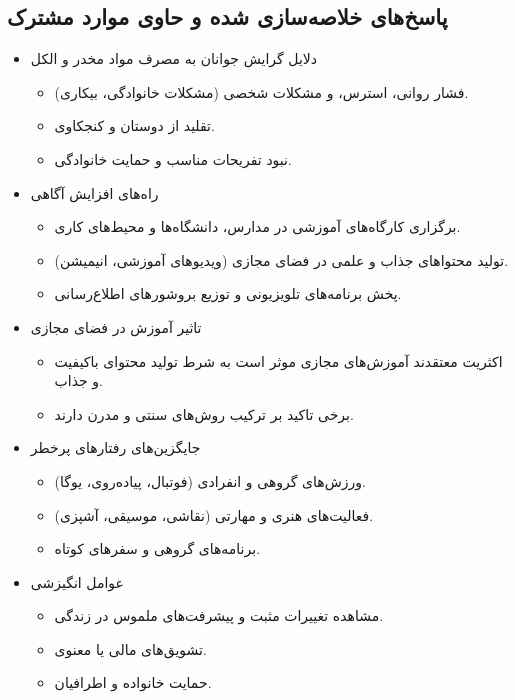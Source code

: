 \documentclass[dvipsnames, svgnames, x11names, 11pt]{article}
\begin{document}
\subsection{پاسخ‌های خلاصه‌سازی شده و حاوی موارد مشترک}
\begin{itemize}
\item 
دلایل گرایش جوانان به مصرف مواد مخدر و الکل

\begin{itemize}
\item 
فشار روانی، استرس، و مشکلات شخصی (مشکلات خانوادگی، بیکاری).
\item 
تقلید از دوستان و کنجکاوی.
\item 
نبود تفریحات مناسب و حمایت خانوادگی.
\end{itemize}

\item 
راه‌های افزایش آگاهی

\begin{itemize}
\item 
برگزاری کارگاه‌های آموزشی در مدارس، دانشگاه‌ها و محیط‌های کاری.
\item 
تولید محتواهای جذاب و علمی در فضای مجازی (ویدیوهای آموزشی، انیمیشن).
\item 
پخش برنامه‌های تلویزیونی و توزیع بروشورهای اطلاع‌رسانی.
\end{itemize}

\item 
تاثیر آموزش در فضای مجازی

\begin{itemize}
\item 
اکثریت معتقدند آموزش‌های مجازی موثر است به شرط تولید محتوای باکیفیت و جذاب.
\item 
برخی تاکید بر ترکیب روش‌های سنتی و مدرن دارند.
\end{itemize}

\item 
جایگزین‌های رفتارهای پرخطر

\begin{itemize}
\item 
ورزش‌های گروهی و انفرادی (فوتبال، پیاده‌روی، یوگا).
\item 
فعالیت‌های هنری و مهارتی (نقاشی، موسیقی، آشپزی).
\item 
برنامه‌های گروهی و سفرهای کوتاه.
\end{itemize}

\item 
عوامل انگیزشی
\begin{itemize}
\item 
مشاهده تغییرات مثبت و پیشرفت‌های ملموس در زندگی.
\item 
تشویق‌های مالی یا معنوی.
\item 
حمایت خانواده و اطرافیان.
\end{itemize}


\end{itemize}
\end{document}
